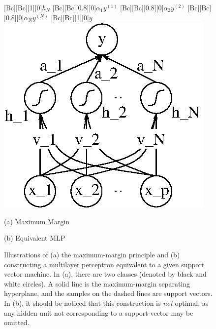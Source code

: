 \documentclass{now}
\begin{document}
\begin{figure}[t]
\begin{minipage}{0.48\textwidth}
        [Bc][Bc][1][0]{$h_N$}
        [Bc][Bc][0.8][0]{$\alpha_1 y^{(1)}$}
        [Bc][Bc][0.8][0]{$\alpha_2 y^{(2)}$}
        [Bc][Bc][0.8][0]{$\alpha_N y^{(N)}$}
        [Bc][Bc][1][0]{$y$}
        \includegraphics[width=0.75\columnwidth]{../figures/mlp_svm.eps}
    \end{minipage}

    \vspace{2mm}
    \begin{minipage}{0.48\textwidth}
        \centering
        \small
        (a) Maximum Margin
    \end{minipage}
    \begin{minipage}{0.48\textwidth}
        \centering
        \small
        (b) Equivalent MLP
    \end{minipage}
    \caption{Illustrations of (a) the maximum-margin principle and (b)
        constructing a multilayer perceptron equivalent to a given support
        vector machine.  In (a), there are two classes (denoted by black and
        white circles). A solid line is the maximum-margin separating
        hyperplane, and the samples on the dashed lines are support vectors. In
        (b), it should be noticed that this construction is \textit{not}
        optimal, as any hidden unit not corresponding to a support-vector may be
    omitted.}
    \label{fig:svm}
\end{figure}

\end{document}

